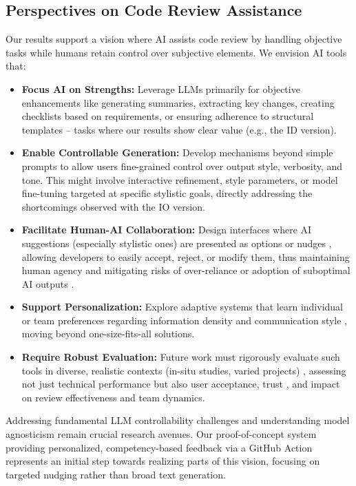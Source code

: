 \documentclass[conference]{IEEEtran}
\begin{document}
\subsection{Perspectives on Code Review Assistance} %
Our results support a vision where AI assists code review by handling objective tasks while humans retain control over subjective elements. We envision AI tools that:
\begin{itemize}
    \item \textbf{Focus AI on Strengths:} Leverage LLMs primarily for objective enhancements like generating summaries, extracting key changes, creating checklists based on requirements, or ensuring adherence to structural templates – tasks where our results show clear value (e.g., the ID version).
    \item \textbf{Enable Controllable Generation:} Develop mechanisms beyond simple prompts to allow users fine-grained control over output style, verbosity, and tone. This might involve interactive refinement, style parameters, or model fine-tuning targeted at specific stylistic goals, directly addressing the shortcomings observed with the IO version.
    \item \textbf{Facilitate Human-AI Collaboration:} Design interfaces where AI suggestions (especially stylistic ones) are presented as options or nudges \cite{caraban2019ways}, allowing developers to easily accept, reject, or modify them, thus maintaining human agency and mitigating risks of over-reliance or adoption of suboptimal AI outputs \cite{gao2023impact}.
    \item \textbf{Support Personalization:} Explore adaptive systems that learn individual or team preferences regarding information density and communication style \cite{zhang2024personalization}, moving beyond one-size-fits-all solutions.
    \item \textbf{Require Robust Evaluation:} Future work must rigorously evaluate such tools in diverse, realistic contexts (in-situ studies, varied projects) \cite{robillard2024communicating}, assessing not just technical performance but also user acceptance, trust \cite{mehrotra2024systematic}, and impact on review effectiveness and team dynamics.
\end{itemize}
Addressing fundamental LLM controllability challenges \cite{lee2025poor} and understanding model agnosticism remain crucial research avenues. Our proof-of-concept system providing personalized, competency-based feedback via a GitHub Action represents an initial step towards realizing parts of this vision, focusing on targeted nudging rather than broad text generation.
\end{document}

